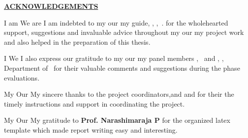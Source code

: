 \thispagestyle{empty}

\begin{center}
\Large\textbf{\underline{ACKNOWLEDGEMENTS}} \par
\end{center}

\ifPG I am \else
\ifStuNameBUsed We are \else I am \fi\fi indebted to \ifPG my \else\ifStuNameBUsed our \else my \fi\fi guide, \textbf{\printGuideNameA}, \printGuideDesigA, \printGuideOrgA$\,.$ for the wholehearted support, suggestions and invaluable advice throughout \ifPG my \else\ifStuNameBUsed our \else my \fi\fi project work and also helped in the preparation of this thesis.\\ \par

\ifPG I \else \ifStuNameBUsed We \else I \fi\fi also express our gratitude to \ifPG my \else\ifStuNameBUsed our \else my \fi\fi  panel members \textbf{\printPanelMemberA}, \printPanelMemberDesigA $\,$ and \textbf{\printPanelMemberB}, \printPanelMemberDesigB , Department of \printDepartmentLF\, for their valuable comments and suggestions during the phase evaluations. \\ \par

\ifPG My \else \ifStuNameBUsed Our \else My \fi\fi sincere thanks to the project coordinator\ifProjectMemBUsed s\fi\space \textbf{\printProjectMemberA}\ifProjectMemBUsed \ifProjectMemCUsed,\space \else\space and\space \fi\textbf{\printProjectMemberB} \ifProjectMemCUsed\space and \textbf{\printProjectMemberC} \fi\fi\space for \ifProjectMemBUsed their \else the \fi timely instructions and support in coordinating the project.\\ \par

\ifPG My \else \ifStuNameBUsed Our \else My \fi\fi gratitude to \textbf{Prof. Narashimaraja P} for the organized latex template which made report writing easy and interesting.\\ \par


